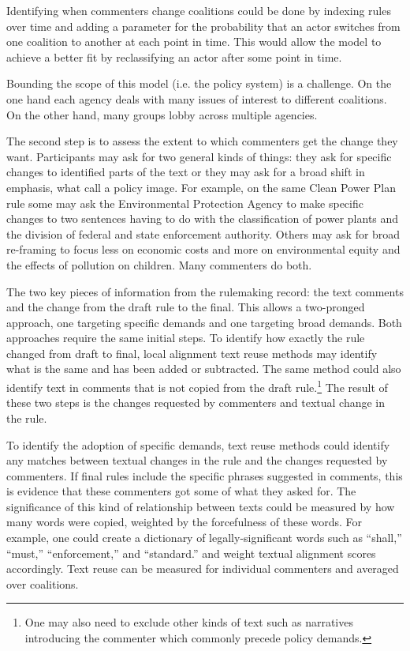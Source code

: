 \documentclass{article}
\begin{document}
Identifying when commenters change coalitions could be done by indexing rules over time and adding a parameter for the probability that an actor switches from one coalition to another at each point in time. This would allow the model to achieve a better fit by reclassifying an actor after some point in time.%

Bounding the scope of this model (i.e. the policy system) is a challenge. On the one hand each agency deals with many issues of interest to different coalitions. On the other hand, many groups lobby across multiple agencies. %

The second step is to assess the extent to which commenters get the change they want.
Participants may ask for two general kinds of things: they ask for specific changes to identified parts of the text or they may ask for a broad shift in emphasis, what \citet{Jones2005} call a policy image. For example, on the same Clean Power Plan rule some may ask the Environmental Protection Agency to make specific changes to two sentences having to do with the classification of power plants and the division of federal and state enforcement authority. Others may ask for broad re-framing to focus less on economic costs and more on environmental equity and the effects of pollution on children. Many commenters do both. 

The two key pieces of information from the rulemaking record: the text comments and the change from the draft rule to the final. This allows a two-pronged approach, one targeting specific demands and one targeting broad demands. Both approaches require the same initial steps. To identify how exactly the rule changed from draft to final, local alignment text reuse methods may identify what is the same and has been added or subtracted. The same method could also identify text in comments that is not copied from the draft rule.\footnote{One may also need to exclude other kinds of text such as narratives introducing the commenter which commonly precede policy demands.} The result of these two steps is the changes requested by commenters and textual change in the rule. 

To identify the adoption of specific demands,  text reuse methods could identify any matches between textual changes in the rule and the changes requested by commenters. If final rules include the specific phrases suggested in comments, this is evidence that these commenters got some of what they asked for. The significance of this kind of relationship between texts could be measured by how many words were copied, weighted by the forcefulness of these words. For example, one could create a dictionary of legally-significant words such as ``shall,'' ``must,'' ``enforcement,'' and ``standard.'' and weight textual alignment scores accordingly. Text reuse can be measured for individual commenters and averaged over coalitions. 
\end{document}
